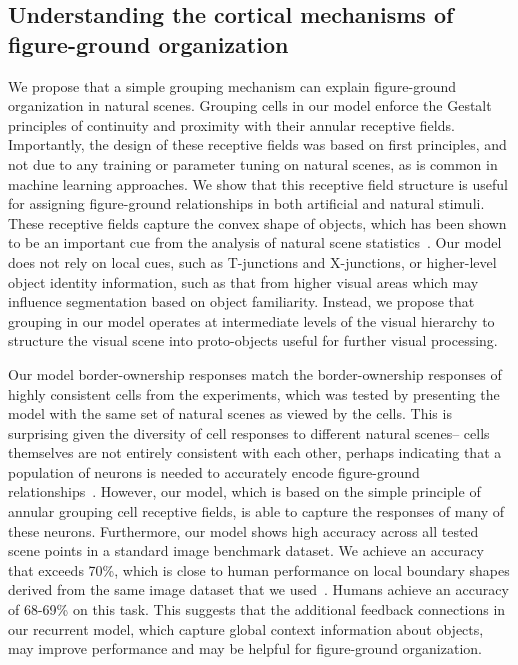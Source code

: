 \subsection{Understanding the cortical mechanisms of figure-ground organization}
We propose that a simple grouping mechanism can explain figure-ground organization in natural scenes. Grouping cells in our model enforce the Gestalt principles of continuity and proximity with their annular receptive fields. Importantly, the design of these receptive fields was based on first principles, and not due to any training or parameter tuning on natural scenes, as is common in machine learning approaches. We show that this receptive field structure is useful for assigning figure-ground relationships in both artificial and natural stimuli. These receptive fields capture the convex shape of objects, which has been shown to be an important cue from the analysis of natural scene statistics~\citep{Sigman_etal01}. Our model does not rely on local cues, such as T-junctions and X-junctions, or higher-level object identity information, such as that from higher visual areas which may influence segmentation based on object familiarity. Instead, we propose that grouping in our model operates at intermediate levels of the visual hierarchy to structure the visual scene into proto-objects useful for further visual processing.

Our model border-ownership responses match the border-ownership responses of highly consistent cells from the experiments, which was tested by presenting the model with the same set of natural scenes as viewed by the cells. This is surprising given the diversity of cell responses to different natural scenes-- cells themselves are not entirely consistent with each other, perhaps indicating that a population of neurons is needed to accurately encode figure-ground relationships~\citep{Hesse_Tsao16}. However, our model, which is based on the simple principle of annular grouping cell receptive fields, is able to capture the responses of many of these neurons.
%
%
Furthermore, our model shows high accuracy across all tested scene points in a standard image benchmark dataset. We achieve an accuracy that exceeds 70\%, which is close to human performance on local boundary shapes derived from the same image dataset that we used~\citep{Fowlkes_etal07}. Humans achieve an accuracy of 68-69\% on this task. This suggests that the additional feedback connections in our recurrent model, which capture global context information about objects, may improve performance and may be helpful for figure-ground organization.

